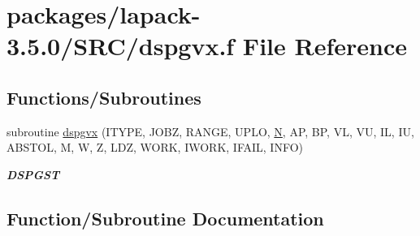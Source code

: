 \hypertarget{dspgvx_8f}{}\section{packages/lapack-\/3.5.0/\+S\+R\+C/dspgvx.f File Reference}
\label{dspgvx_8f}
\subsection*{Functions/\+Subroutines}
\begin{DoxyCompactItemize}
\item 
subroutine \hyperlink{dspgvx_8f_a059beb16ce5345c3a2dfbf9692650401}{dspgvx} (I\+T\+Y\+P\+E, J\+O\+B\+Z, R\+A\+N\+G\+E, U\+P\+L\+O, \hyperlink{polmisc_8c_a0240ac851181b84ac374872dc5434ee4}{N}, A\+P, B\+P, V\+L, V\+U, I\+L, I\+U, A\+B\+S\+T\+O\+L, M, W, Z, L\+D\+Z, W\+O\+R\+K, I\+W\+O\+R\+K, I\+F\+A\+I\+L, I\+N\+F\+O)
\begin{DoxyCompactList}\small\item\em {\bfseries D\+S\+P\+G\+S\+T} \end{DoxyCompactList}\end{DoxyCompactItemize}


\subsection{Function/\+Subroutine Documentation}
\hypertarget{dspgvx_8f_a059beb16ce5345c3a2dfbf9692650401}{}
